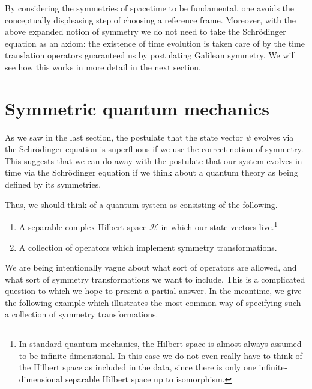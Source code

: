 \documentclass[a4paper,10pt]{scrreprt}
\theoremstyle{definition}
\theoremstyle{plain}
\theoremstyle{remark}
\begin{document}
By considering the symmetries of spacetime to be fundamental, one avoids the conceptually displeasing step of choosing a reference frame. Moreover, with the above expanded notion of symmetry we do not need to take the Schr\"{o}dinger equation as an axiom: the existence of time evolution is taken care of by the time translation operators guaranteed us by postulating Galilean symmetry. We will see how this works in more detail in the next section.

\section{Symmetric quantum mechanics} \label{sec:symmetricqm}
As we saw in the last section, the postulate that the state vector $\psi$ evolves via the Schr\"{o}dinger equation is superfluous if we use the correct notion of symmetry. This suggests that we can do away with the postulate that our system evolves in time via the Schr\"{o}dinger equation if we think about a quantum theory as being defined by its symmetries.

Thus, we should think of a quantum system as consisting of the following.
\begin{enumerate}
  \item A separable complex Hilbert space $\mathscr{H}$ in which our state vectors live.\footnote{In standard quantum mechanics, the Hilbert space is almost always assumed to be infinite-dimensional. In this case we do not even really have to think of the Hilbert space as included in the data, since there is only one infinite-dimensional separable Hilbert space up to isomorphism.}

  \item A collection of operators which implement symmetry transformations.

\end{enumerate}

We are being intentionally vague about what sort of operators are allowed, and what sort of symmetry transformations we want to include. This is a complicated question to which we hope to present a partial answer. In the meantime, we give the following example which illustrates the most common way of specifying such a collection of symmetry transformations.
\end{document}
